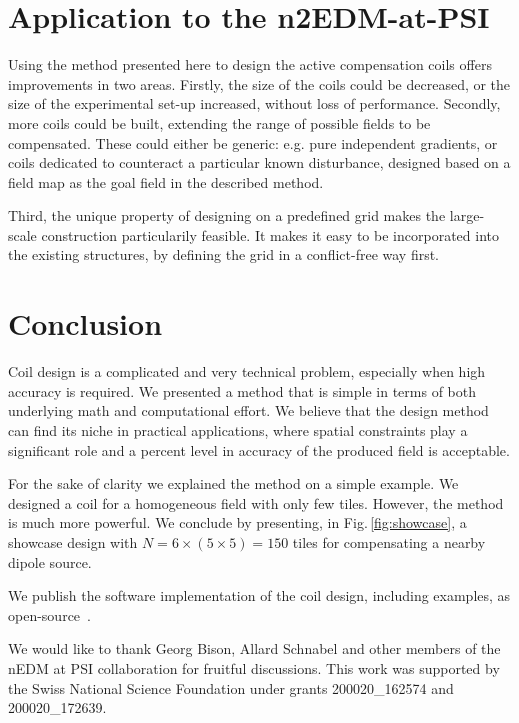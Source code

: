 \section{Application to the n2EDM-at-PSI}
Using the method presented here to design the active compensation coils offers improvements in two areas. Firstly, the size of the coils could be decreased, or the size of the experimental set-up increased, without loss of performance. Secondly, more coils could be built, extending the range of possible fields to be compensated. These could either be generic: e.g. pure independent gradients, or coils dedicated to counteract a particular known disturbance, designed based on a field map as the goal field in the described method.

Third, the unique property of designing on a predefined grid makes the large-scale construction particularily feasible. It makes it easy to be incorporated into the existing structures, by defining the grid in a conflict-free way first.



\section{Conclusion}
Coil design is a complicated and very technical problem, especially when high accuracy is required. We presented a method that is simple in terms of both underlying math and computational effort. We believe that the design method can find its niche in practical applications, where spatial constraints play a significant role and a percent level in accuracy of the produced field is acceptable.

For the sake of clarity we explained the method on a simple example. We designed a coil for a homogeneous field with only few tiles. However, the method is much more powerful. We conclude by presenting, in Fig.\,\ref{fig:showcase}, a showcase design with $N = 6 \times (5 \times 5) = 150$ tiles for compensating a nearby dipole source.

We publish the software implementation of the coil design, including examples, as open-source~\cite{Coilsjlcode}.

We would like to thank Georg Bison, Allard Schnabel and other members of the nEDM at PSI collaboration for fruitful discussions. This work was supported by the Swiss National Science Foundation under grants 200020\_162574 and 200020\_172639.

